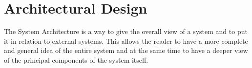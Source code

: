 \chapter{Architectural Design} \label{chap3}
The System Architecture is a way to give the overall view of a system and to put it in relation to external systems. This allows the reader to have a more complete and general idea of the entire system and at the same time to have a deeper view of the principal components of the system itself.
